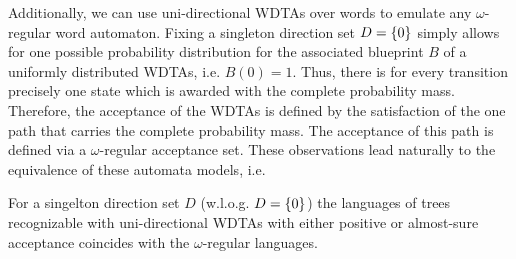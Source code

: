 Additionally, we can use uni-directional \acp{WDTA} over words to emulate any 
$\omega$-regular word automaton. Fixing a singleton direction set $D = \left\{0\right\}$ 
simply allows for one possible probability distribution for the associated 
blueprint $B$ of a uniformly distributed \acp{WDTA}, i.e.  $B(0) = 1$. Thus, 
there is for every transition precisely one state which is awarded with the 
complete probability mass. 
Therefore, the acceptance of the \acp{WDTA} is defined by the satisfaction of
the one path that carries the complete probability mass. The acceptance of this
path is defined via a $\omega$-regular acceptance set. These observations lead
naturally to the equivalence of these automata models, i.e.
\begin{theorem}
  For a singelton direction set $D$ (w.l.o.g. $D = \left\{0\right\}$) the languages of
  trees recognizable with uni-directional \acp{WDTA} with either positive 
  or almost-sure acceptance coincides with the $\omega$-regular languages.
  \label{thm:omegaregaswdta}
\end{theorem}

